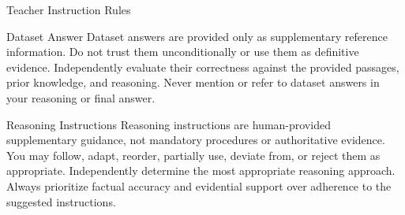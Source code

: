 \begin{frame}{Teacher Instruction Rules}

\small

\begin{block}{Dataset Answer}
    Dataset answers are provided only as supplementary reference
    information. Do not trust them unconditionally or use them as
    definitive evidence. Independently evaluate their correctness
    against the provided passages, prior knowledge, and reasoning.
    Never mention or refer to dataset answers in your reasoning
    or final answer.
\end{block}

\vspace{0.2cm}

\begin{block}{Reasoning Instructions}
    Reasoning instructions are human-provided supplementary guidance,
    not mandatory procedures or authoritative evidence. You may follow,
    adapt, reorder, partially use, deviate from, or reject them as
    appropriate. Independently determine the most appropriate reasoning
    approach. Always prioritize factual accuracy and evidential support
    over adherence to the suggested instructions.
\end{block}

\end{frame}

